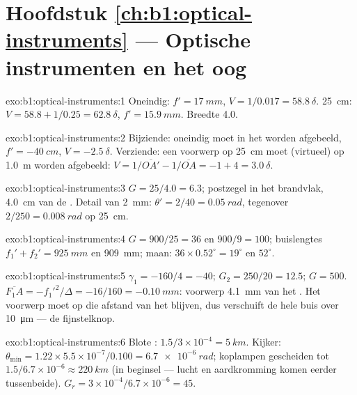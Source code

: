\section*{Hoofdstuk \ref{ch:b1:optical-instruments} --- Optische instrumenten en het oog}

\begin{solution}{exo:b1:optical-instruments:1}
Oneindig: $f' = \qty{17}{mm}$, $V = 1/0.017 = \qty{58.8}{\delta}$.
\qty{25}{cm}: $V = 58.8 + 1/0.25 = \qty{62.8}{\delta}$, $f' = \qty{15.9}{mm}$.
Breedte \qty{4.0}{\delta}.
\end{solution}

\begin{solution}{exo:b1:optical-instruments:2}
Bijziende: oneindig moet in het  worden afgebeeld, $f' = \qty{-40}{cm}$,
$V = \qty{-2.5}{\delta}$. Verziende: een voorwerp op \qty{25}{cm} moet
(virtueel) op \qty{1.0}{m} worden afgebeeld: $V = 1/\overline{OA'} - 1/\overline{OA}
= -1 + 4 = \qty{+3.0}{\delta}$.
\end{solution}

\begin{solution}{exo:b1:optical-instruments:3}
$G = 25/4.0 = 6.3$; postzegel in het brandvlak, \qty{4.0}{cm} van de
. Detail van \qty{2}{mm}: $\theta' = 2/40 = \qty{0.05}{rad}$, tegenover
$2/250 = \qty{0.008}{rad}$ op \qty{25}{cm}.
\end{solution}

\begin{solution}{exo:b1:optical-instruments:4}
$G = 900/25 = 36$ en $900/9 = 100$; buislengtes $f_1' + f_2' =
\qty{925}{mm}$ en \qty{909}{mm}; maan: $36 \times 0.52^\circ = 19^\circ$
en $52^\circ$.
\end{solution}

\begin{solution}{exo:b1:optical-instruments:5}
$\gamma_1 = -160/4 = -40$; $G_2 = 250/20 = 12.5$; $G = 500$.
$\overline{F_1A} = -f_1'^2/\Delta = -16/160 = \qty{-0.10}{mm}$: voorwerp
\qty{4.1}{mm} van het . Het voorwerp moet op die afstand van het
 blijven, dus verschuift de hele buis over \qty{10}{\micro m} ---
de fijnstelknop.
\end{solution}

\begin{solution}{exo:b1:optical-instruments:6}
Blote : $1.5/3\times10^{-4} = \qty{5}{km}$. Kijker: $\theta_{\min}
= 1.22 \times 5.5\times10^{-7}/0.100 = \qty{6.7e-6}{rad}$; koplampen
gescheiden tot $1.5/6.7\times10^{-6} \approx \qty{220}{km}$ (in
beginsel --- lucht en aardkromming komen eerder tussenbeide). $G_r = 3\times10^{-4}/
6.7\times10^{-6} = 45$.
\end{solution}

